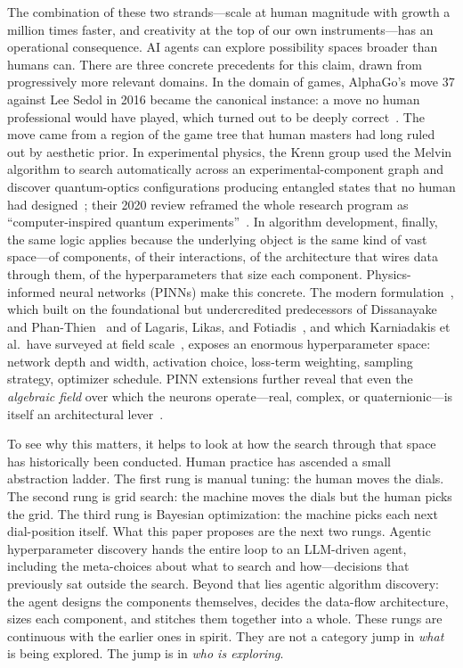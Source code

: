 \documentclass[11pt]{article}
\begin{document}
The combination of these two strands---scale at human magnitude with growth a million times faster, and creativity at the top of our own instruments---has an operational consequence. AI agents can explore possibility spaces broader than humans can. There are three concrete precedents for this claim, drawn from progressively more relevant domains. In the domain of games, AlphaGo's move 37 against Lee Sedol in 2016 became the canonical instance: a move no human professional would have played, which turned out to be deeply correct~\cite{silver2016alphago}. The move came from a region of the game tree that human masters had long ruled out by aesthetic prior. In experimental physics, the Krenn group used the Melvin algorithm to search automatically across an experimental-component graph and discover quantum-optics configurations producing entangled states that no human had designed~\cite{krenn2016automated}; their 2020 review reframed the whole research program as ``computer-inspired quantum experiments''~\cite{krenn2020computer}. In algorithm development, finally, the same logic applies because the underlying object is the same kind of vast space---of components, of their interactions, of the architecture that wires data through them, of the hyperparameters that size each component. Physics-informed neural networks (PINNs) make this concrete. The modern formulation~\cite{raissi2019pinn}, which built on the foundational but undercredited predecessors of Dissanayake and Phan-Thien~\cite{dissanayake1994} and of Lagaris, Likas, and Fotiadis~\cite{lagaris1998}, and which Karniadakis et al.\ have surveyed at field scale~\cite{karniadakis2021piml}, exposes an enormous hyperparameter space: network depth and width, activation choice, loss-term weighting, sampling strategy, optimizer schedule. PINN extensions further reveal that even the \emph{algebraic field} over which the neurons operate---real, complex, or quaternionic---is itself an architectural lever~\cite{aizenberg2007mlmvn,gidon2020dendritic}.

To see why this matters, it helps to look at how the search through that space has historically been conducted. Human practice has ascended a small abstraction ladder. The first rung is manual tuning: the human moves the dials. The second rung is grid search: the machine moves the dials but the human picks the grid. The third rung is Bayesian optimization: the machine picks each next dial-position itself. What this paper proposes are the next two rungs. Agentic hyperparameter discovery hands the entire loop to an LLM-driven agent, including the meta-choices about what to search and how---decisions that previously sat outside the search. Beyond that lies agentic algorithm discovery: the agent designs the components themselves, decides the data-flow architecture, sizes each component, and stitches them together into a whole. These rungs are continuous with the earlier ones in spirit. They are not a category jump in \emph{what} is being explored. The jump is in \emph{who is exploring}.
\end{document}

